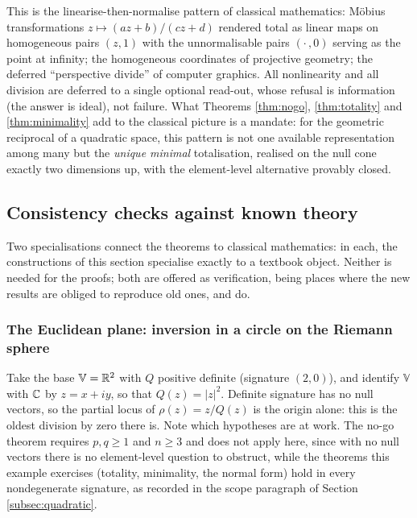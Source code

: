 \begin{remark}\label{rem:classical}
This is the linearise-then-normalise pattern of classical mathematics: M\"obius transformations $z \mapsto (az+b)/(cz+d)$ rendered total as linear maps on homogeneous pairs $(z,1)$ with the unnormalisable pairs $(\cdot\,,0)$ serving as the point at infinity; the homogeneous coordinates of projective geometry; the deferred ``perspective divide'' of computer graphics. All nonlinearity and all division are deferred to a single optional read-out, whose refusal is information (the answer is ideal), not failure. What Theorems \ref{thm:nogo}, \ref{thm:totality} and \ref{thm:minimality} add to the classical picture is a mandate: for the geometric reciprocal of a quadratic space, this pattern is not one available representation among many but the \emph{unique minimal} totalisation, realised on the null cone exactly two dimensions up, with the element-level alternative provably closed.
\end{remark}

\subsection{Consistency checks against known theory}\label{sec:checks}

Two specialisations connect the theorems to classical mathematics: in each, the constructions of this section specialise exactly to a textbook object. Neither is needed for the proofs; both are offered as verification, being places where the new results are obliged to reproduce old ones, and do.

\subsubsection{The Euclidean plane: inversion in a circle on the Riemann sphere}\label{subsec:sphere}

Take the base $\mathbb{V} = \mathbb{R}^2$ with $Q$ positive definite (signature $(2,0)$), and identify $\mathbb{V}$ with $\mathbb{C}$ by $z = x + iy$, so that $Q(z) = |z|^2$. Definite signature has no null vectors, so the partial locus of $\rho(z) = z/Q(z)$ is the origin alone: this is the oldest division by zero there is. Note which hypotheses are at work. The no-go theorem requires $p, q \geq 1$ and $n \geq 3$ and does not apply here, since with no null vectors there is no element-level question to obstruct, while the theorems this example exercises (totality, minimality, the normal form) hold in every nondegenerate signature, as recorded in the scope paragraph of Section \ref{subsec:quadratic}.

